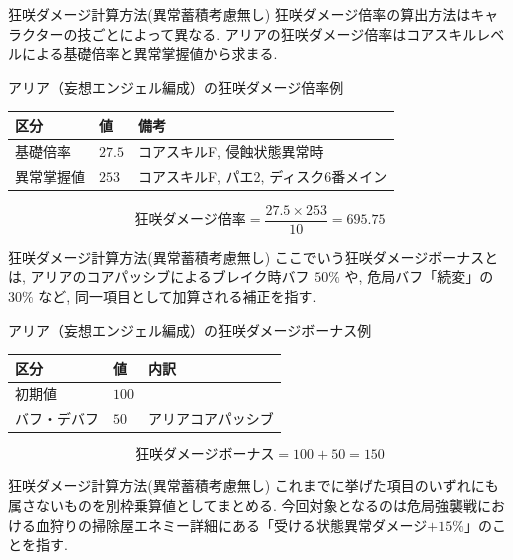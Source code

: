 \documentclass[aspectratio=169]{beamer}
\begin{document}

\begin{frame}{狂咲ダメージ計算方法(異常蓄積考慮無し)}
狂咲ダメージ倍率の算出方法はキャラクターの技ごとによって異なる. アリアの狂咲ダメージ倍率はコアスキルレベルによる基礎倍率と異常掌握値から求まる.
\begin{block}{アリア（妄想エンジェル編成）の狂咲ダメージ倍率例}
\small
\begin{tabularx}{\linewidth}{@{}l l X@{}}
区分 & 値 & 備考 \\
\midrule
基礎倍率 & $27.5$ & コアスキルF, 侵蝕状態異常時 \\
\midrule
異常掌握値 & $253$ & コアスキルF, パエ2, ディスク6番メイン \\
\midrule
\end{tabularx}
\vspace{0.4em}
\[
  \text{狂咲ダメージ倍率} = \frac{27.5 \times 253}{10} = 695.75
\]
\end{block}
\end{frame}


\begin{frame}{狂咲ダメージ計算方法(異常蓄積考慮無し)}
ここでいう狂咲ダメージボーナスとは,
アリアのコアパッシブによるブレイク時バフ \(50\%\) や,
危局バフ「続変」の \(30\%\) など,
同一項目として加算される補正を指す.
\begin{block}{アリア（妄想エンジェル編成）の狂咲ダメージボーナス例}
\small
\begin{tabularx}{\linewidth}{@{}l l X@{}}
区分 & 値 & 内訳 \\
\midrule
初期値 & $100$ &  \\
\midrule
バフ・デバフ & $50$ & アリアコアパッシブ \\
\end{tabularx}
\vspace{0.4em}
\[
  \text{狂咲ダメージボーナス} = 100 + 50 = 150
\]
\end{block}
\end{frame}


\begin{frame}{狂咲ダメージ計算方法(異常蓄積考慮無し)}
これまでに挙げた項目のいずれにも属さないものを別枠乗算値としてまとめる.
今回対象となるのは危局強襲戦における血狩りの掃除屋エネミー詳細にある「受ける状態異常ダメージ$+15\%$」のことを指す.

\end{frame}
\end{document}
